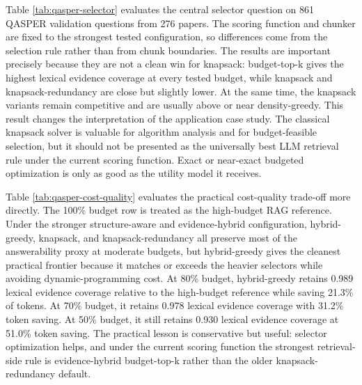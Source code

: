 \documentclass[conference]{IEEEtran}
\begin{document}


Table \ref{tab:qasper-selector} evaluates the central selector question on 861 QASPER validation questions from 276 papers. The scoring function and chunker are fixed to the strongest tested configuration, so differences come from the selection rule rather than from chunk boundaries. The results are important precisely because they are not a clean win for knapsack: budget-top-k gives the highest lexical evidence coverage at every tested budget, while knapsack and knapsack-redundancy are close but slightly lower. At the same time, the knapsack variants remain competitive and are usually above or near density-greedy. This result changes the interpretation of the application case study. The classical knapsack solver is valuable for algorithm analysis and for budget-feasible selection, but it should not be presented as the universally best LLM retrieval rule under the current scoring function. Exact or near-exact budgeted optimization is only as good as the utility model it receives.



Table \ref{tab:qasper-cost-quality} evaluates the practical cost-quality trade-off more directly. The 100\% budget row is treated as the high-budget RAG reference. Under the stronger structure-aware and evidence-hybrid configuration, hybrid-greedy, knapsack, and knapsack-redundancy all preserve most of the answerability proxy at moderate budgets, but hybrid-greedy gives the cleanest practical frontier because it matches or exceeds the heavier selectors while avoiding dynamic-programming cost. At 80\% budget, hybrid-greedy retains 0.989 lexical evidence coverage relative to the high-budget reference while saving 21.3\% of tokens. At 70\% budget, it retains 0.978 lexical evidence coverage with 31.2\% token saving. At 50\% budget, it still retains 0.930 lexical evidence coverage at 51.0\% token saving. The practical lesson is conservative but useful: selector optimization helps, and under the current scoring function the strongest retrieval-side rule is evidence-hybrid budget-top-k rather than the older knapsack-redundancy default.


\end{document}
